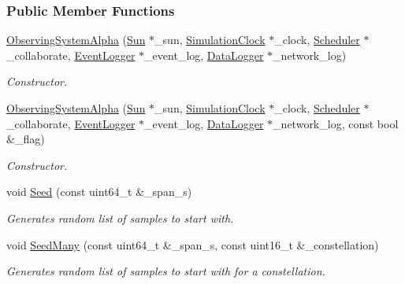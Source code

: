 \subsubsection*{Public Member Functions}
\begin{DoxyCompactItemize}
\item 
\hyperlink{classosse_1_1collaborate_1_1_observing_system_alpha_ab282044b92aabebc6d9d31e0c9ab84b6}{Observing\+System\+Alpha} (\hyperlink{classosse_1_1collaborate_1_1_sun}{Sun} $\ast$\+\_\+sun, \hyperlink{classosse_1_1collaborate_1_1_simulation_clock}{Simulation\+Clock} $\ast$\+\_\+clock, \hyperlink{classosse_1_1collaborate_1_1_scheduler}{Scheduler} $\ast$\+\_\+collaborate, \hyperlink{classosse_1_1collaborate_1_1_event_logger}{Event\+Logger} $\ast$\+\_\+event\+\_\+log, \hyperlink{classosse_1_1collaborate_1_1_data_logger}{Data\+Logger} $\ast$\+\_\+network\+\_\+log)
\begin{DoxyCompactList}\small\item\em Constructor. \end{DoxyCompactList}\item 
\hyperlink{classosse_1_1collaborate_1_1_observing_system_alpha_a4f22ecd7429656408684eba1adf5d62e}{Observing\+System\+Alpha} (\hyperlink{classosse_1_1collaborate_1_1_sun}{Sun} $\ast$\+\_\+sun, \hyperlink{classosse_1_1collaborate_1_1_simulation_clock}{Simulation\+Clock} $\ast$\+\_\+clock, \hyperlink{classosse_1_1collaborate_1_1_scheduler}{Scheduler} $\ast$\+\_\+collaborate, \hyperlink{classosse_1_1collaborate_1_1_event_logger}{Event\+Logger} $\ast$\+\_\+event\+\_\+log, \hyperlink{classosse_1_1collaborate_1_1_data_logger}{Data\+Logger} $\ast$\+\_\+network\+\_\+log, const bool \&\+\_\+flag)
\begin{DoxyCompactList}\small\item\em Constructor. \end{DoxyCompactList}\item 
void \hyperlink{classosse_1_1collaborate_1_1_observing_system_alpha_a99b9d34ab9304624d36253d4431d34e7}{Seed} (const uint64\+\_\+t \&\+\_\+span\+\_\+s)
\begin{DoxyCompactList}\small\item\em Generates random list of samples to start with. \end{DoxyCompactList}\item 
void \hyperlink{classosse_1_1collaborate_1_1_observing_system_alpha_a6f6e7a1f24d7890c9da666e9e90ecb2b}{Seed\+Many} (const uint64\+\_\+t \&\+\_\+span\+\_\+s, const uint16\+\_\+t \&\+\_\+constellation)
\begin{DoxyCompactList}\small\item\em Generates random list of samples to start with for a constellation. \end{DoxyCompactList}\item 

\end{DoxyCompactItemize}

